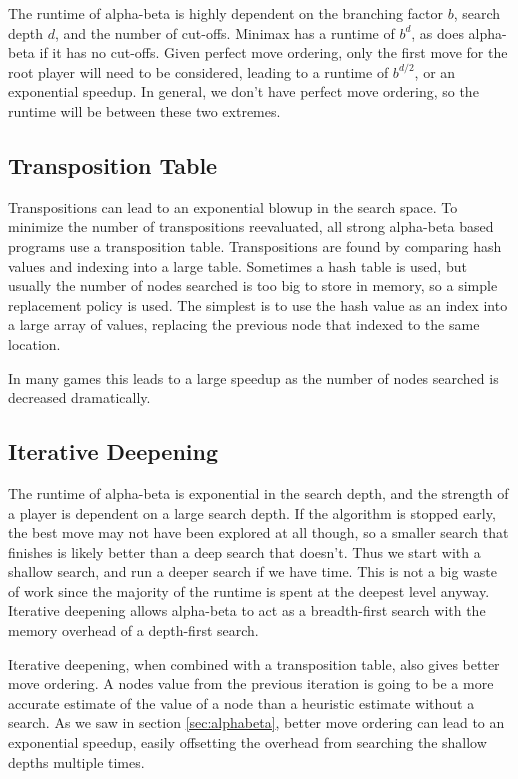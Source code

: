 The runtime of alpha-beta is highly dependent on the branching factor $b$, search depth $d$, and the number of cut-offs. Minimax has a runtime of $b^d$, as does alpha-beta if it has no cut-offs. Given perfect move ordering, only the first move for the root player will need to be considered, leading to a runtime of $b^{d/2}$, or an exponential speedup. In general, we don't have perfect move ordering, so the runtime will be between these two extremes.

\subsection{Transposition Table}

Transpositions can lead to an exponential blowup in the search space. To minimize the number of transpositions reevaluated, all strong alpha-beta based programs use a transposition table. Transpositions are found by comparing hash values and indexing into a large table. Sometimes a hash table is used, but usually the number of nodes searched is too big to store in memory, so a simple replacement policy is used. The simplest is to use the hash value as an index into a large array of values, replacing the previous node that indexed to the same location.

In many games this leads to a large speedup as the number of nodes searched is decreased dramatically.


\subsection{Iterative Deepening}

The runtime of alpha-beta is exponential in the search depth, and the strength of a player is dependent on a large search depth. If the algorithm is stopped early, the best move may not have been explored at all though, so a smaller search that finishes is likely better than a deep search that doesn't. Thus we start with a shallow search, and run a deeper search if we have time. This is not a big waste of work since the majority of the runtime is spent at the deepest level anyway. Iterative deepening allows alpha-beta to act as a breadth-first search with the memory overhead of a depth-first search.

Iterative deepening, when combined with a transposition table, also gives better move ordering. A nodes value from the previous iteration is going to be a more accurate estimate of the value of a node than a heuristic estimate without a search. As we saw in section \ref{sec:alphabeta}, better move ordering can lead to an exponential speedup, easily offsetting the overhead from searching the shallow depths multiple times.

